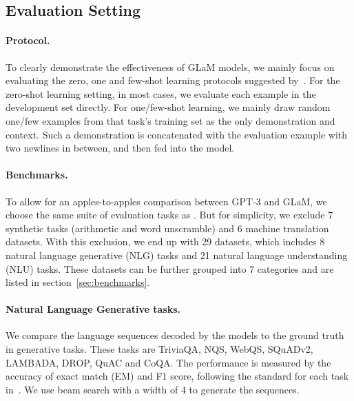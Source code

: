 \documentclass{article}
\newcommand{\glam}{GLaM\xspace}
\begin{document}
\subsection{Evaluation Setting}\label{sec:eval_setting}
\paragraph{Protocol.} To clearly demonstrate the effectiveness of \glam models, we mainly focus on evaluating the zero, one and few-shot learning protocols suggested by~\citet{radford2019language,NEURIPS2020_gpt3}. For the zero-shot learning setting, in most cases, we evaluate each example in the development set directly. For one/few-shot learning, we mainly draw random one/few examples from that task's training set as the only demonstration and context. Such a demonstration is concatenated with the evaluation example with two newlines in between, and then fed into the model.

\paragraph{Benchmarks.} To allow for an apples-to-apples comparison between GPT-3 and \glam, we choose the same suite of evaluation tasks as \citet{NEURIPS2020_gpt3}. But for simplicity, we exclude 7 synthetic tasks (arithmetic and word unscramble) and 6 machine translation datasets. With this exclusion, we end up with 29 datasets, which includes 8 natural language generative (NLG) tasks and 21 natural language understanding (NLU) tasks. These datasets can be further grouped into 7 categories and are listed in section~\ref{sec:benchmarks}.  

\paragraph{Natural Language Generative tasks.} We compare the language sequences decoded by the models to the ground truth in generative tasks. These tasks are TriviaQA, NQS, WebQS, SQuADv2, LAMBADA, DROP, QuAC and CoQA. The performance is measured by the accuracy of exact match (EM) and F1 score, following the standard for each task in~\citet{NEURIPS2020_gpt3}. We use beam search with a width of 4 to generate the sequences. 
\end{document}
